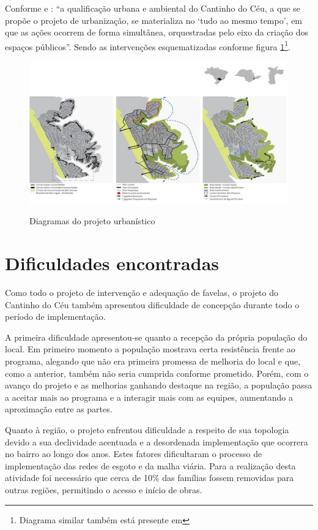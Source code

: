 	Conforme  e : ``a qualificação urbana e ambiental do Cantinho do Céu, a que se propõe o projeto de urbanização, se materializa no  `tudo ao mesmo tempo', em que as ações ocorrem de forma simultânea, orquestradas pelo eixo da criação dos espaços públicos''. Sendo as intervenções esquematizadas conforme figura \ref{fig:proposta_arq}\footnote{Diagrama similar também está presente em }.
	
	\begin{figure}[htb]
		\centering
		\caption{Diagramas do projeto urbanístico}
		\includegraphics[width=\linewidth]{img/proposta}
		\label{fig:proposta_arq}
	\end{figure}
	
	\section{Dificuldades encontradas}
	
	Como todo o projeto de intervenção e adequação de favelas, o projeto do Cantinho do Céu também apresentou dificuldade de concepção durante todo o período de implementação.
	
	A primeira dificuldade apresentou-se quanto a recepção da própria população do local. Em primeiro momento a população mostrava certa resistência frente ao programa, alegando que não era primeira promessa de melhoria do local e que, como a anterior, também não seria cumprida conforme prometido. Porém, com o avanço do projeto e as melhorias ganhando destaque na região, a população passa a aceitar mais ao programa e a interagir mais com as equipes, aumentando a aproximação entre as partes.
	
	Quanto à região, o projeto enfrentou dificuldade a respeito de sua topologia devido a sua declividade acentuada e a desordenada implementação que ocorrera no bairro ao longo dos anos. Estes fatores dificultaram o processo de implementação das redes de esgoto e da malha viária. Para a realização desta atividade foi necessário que cerca de 10\% das famílias fossem removidas para outras regiões, permitindo o acesso e início de obras. 
	
